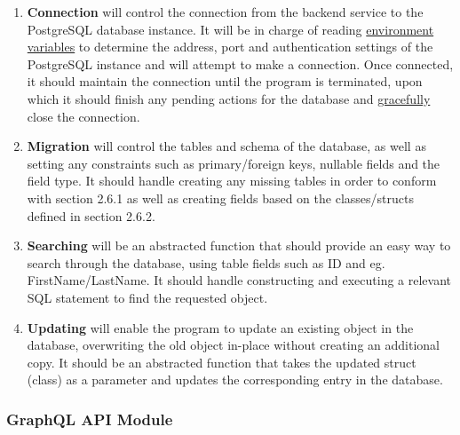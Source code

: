\documentclass[../../main.tex]{subfiles}
\begin{document}
\begin{enumerate}
    \item \textbf{Connection} will control the connection from the
          backend service to the PostgreSQL database instance. It will be in charge
          of reading \underline{environment variables} to determine
          the address, port and authentication settings of the PostgreSQL
          instance and will attempt to make a connection. Once connected,
          it should maintain the connection until the program is terminated,
          upon which it should finish any pending actions for the database
          and \underline{gracefully} close the connection.

    \item \textbf{Migration} will control the tables and schema of the
          database, as well as setting any constraints such as
          primary/foreign keys, nullable fields and the field type.
          It should handle creating any missing tables in order to conform
          with section 2.6.1 as well as creating fields based on the
          classes/structs defined in section 2.6.2.

    \item \textbf{Searching} will be an abstracted function that should
          provide an easy way to search through the database, using table fields
          such as ID and eg. FirstName/LastName. It should handle constructing
          and executing a relevant SQL statement to find the requested object.

    \item \textbf{Updating} will enable the program to update an existing
          object in the database, overwriting the old object in-place without creating
          an additional copy. It should be an abstracted function that takes the updated
          struct (class) as a parameter and updates the corresponding entry in the database.

\end{enumerate}

\subsubsection{GraphQL API Module}
\end{document}
